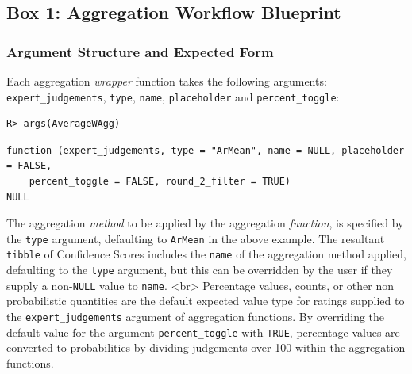 \documentclass[article]{jss}
\begin{document}
\begin{tcolorbox}[enhanced jigsaw, arc=.35mm, breakable, colback=white, colframe=quarto-callout-color-frame, leftrule=.75mm, rightrule=.15mm, opacityback=0, bottomrule=.15mm, left=2mm, toprule=.15mm]

\hypertarget{aggWorkflow}{}
\hypertarget{box-1-aggregation-workflow-blueprint}{%
\subsection*{Box 1: Aggregation Workflow
Blueprint}\label{box-1-aggregation-workflow-blueprint}}

\hypertarget{argument-structure-and-expected-form}{%
\subsubsection{Argument Structure and Expected
Form}\label{argument-structure-and-expected-form}}

Each aggregation \emph{wrapper} function takes the following arguments:
\texttt{expert\_judgements}, \texttt{type}, \texttt{name},
\texttt{placeholder} and \texttt{percent\_toggle}:

\begin{verbatim}
R> args(AverageWAgg)
\end{verbatim}

\begin{verbatim}
function (expert_judgements, type = "ArMean", name = NULL, placeholder = FALSE, 
    percent_toggle = FALSE, round_2_filter = TRUE) 
NULL
\end{verbatim}

The aggregation \emph{method} to be applied by the aggregation
\emph{function}, is specified by the \texttt{type} argument, defaulting
to \texttt{ArMean} in the above example. The resultant \texttt{tibble}
of Confidence Scores includes the \texttt{name} of the aggregation
method applied, defaulting to the \texttt{type} argument, but this can
be overridden by the user if they supply a non-\texttt{NULL} value to
\texttt{name}. \textless br\textgreater{} Percentage values, counts, or
other non probabilistic quantities are the default expected value type
for ratings supplied to the \texttt{expert\_judgements} argument of
aggregation functions. By overriding the default value for the argument
\texttt{percent\_toggle} with \texttt{TRUE}, percentage values are
converted to probabilities by dividing judgements over 100 within the
aggregation functions.


\end{tcolorbox}
\end{document}

